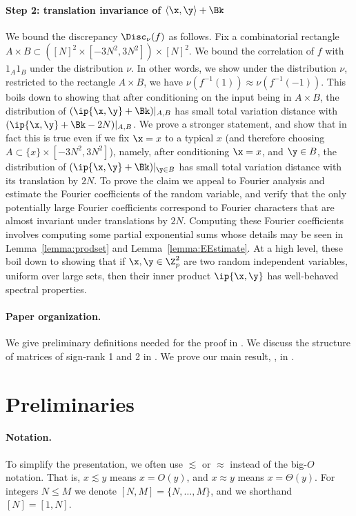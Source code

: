 \paragraph{Step 2: translation invariance of $\langle \x,\y\rangle+\Bk$}
We bound the discrepancy $\Disc_\nu(f)$ as follows. Fix a combinatorial rectangle $A\times B\subset ([N]^2\times [-3N^2,3N^2]) \times [N]^2$. We bound the correlation of $f$ with $1_A1_B$ under the distribution $\nu$. In other words, we show under the distribution $\nu$, restricted to the rectangle $A\times B$, we have $\nu(f^{-1}(1)) \approx \nu(f^{-1}(-1)) $.  This boils down to showing that after conditioning on the input being in $A\times B$, the distribution of $(\ip{\x,\y}+\Bk)|_{A,B}$ has small total variation distance with $(\ip{\x,\y}+\Bk-2N)|_{A,B}$. We prove a stronger  statement, and show that in fact this is true even if we fix $\x=x$ to a typical $x$ (and therefore choosing $A\subset \{x\}\times [-3N^2,3N^2]$), namely, after conditioning $\x=x$, and $\y\in B$, the distribution of $(\ip{\x,\y}+\Bk)|_{\y \in B}$  has small total variation distance with its translation by $2N$. To prove the claim  we appeal to  Fourier analysis and estimate the Fourier coefficients of the random variable, and verify that  the only potentially large Fourier coefficients correspond to Fourier characters that are almost invariant under translations by $2N$. Computing these Fourier coefficients involves computing some partial exponential sums whose details may be seen in Lemma~\ref{lemma:prodset} and Lemma~\ref{lemma:EEstimate}. At a high level, these boil down to showing that if $\x,\y \in \Z_p^2$ are two random independent variables, uniform over large sets, then their inner product $\ip{\x,\y}$ has well-behaved spectral properties.


\paragraph{Paper organization.}
We give preliminary definitions needed for the proof in .
We discuss the structure of matrices of sign-rank 1 and 2 in .
We prove our main result, , in .


\section{Preliminaries}
\label{sec:prelim}

%
\paragraph{Notation.}   %
To simplify the presentation, we often use $\lesssim$ or $\approx$ instead of the big-$O$ notation. That is, $x \lesssim y$ means $x=O(y)$, and $x \approx y$ means $x = \Theta(y)$. For integers $N \le M$ we denote $[N,M]=\{N,\ldots,M\}$, and we shorthand $[N]=[1,N]$.

